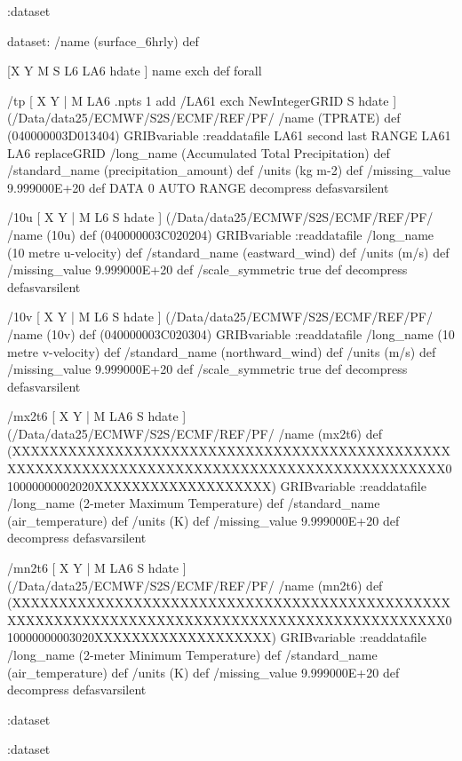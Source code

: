 \begin{ingrid}
:dataset

dataset:
/name (surface_6hrly) def

[X Y M S L6 LA6 hdate ] {name exch def } forall

 /tp { [ X Y | M LA6 .npts 1 add /LA61 exch NewIntegerGRID S hdate ] (/Data/data25/ECMWF/S2S/ECMF/REF/PF/%
 /name (TPRATE) def
  (040000003D013404) GRIBvariable
 :readdatafile
 LA61 second last RANGE
 LA61 LA6 replaceGRID 
 /long_name (Accumulated Total Precipitation) def
 /standard_name (precipitation_amount) def
 /units (kg m-2) def
 /missing_value 9.999000E+20 def
 DATA 0 AUTO RANGE
 decompress
 } defasvarsilent


 /10u { [ X Y | M L6 S hdate ] (/Data/data25/ECMWF/S2S/ECMF/REF/PF/%
/name (10u) def
(040000003C020204) GRIBvariable
:readdatafile
/long_name (10 metre u-velocity) def
/standard_name (eastward_wind) def
/units (m/s) def
/missing_value 9.999000E+20 def
/scale_symmetric true def
decompress
} defasvarsilent

/10v { [ X Y | M L6 S hdate ] (/Data/data25/ECMWF/S2S/ECMF/REF/PF/%
/name (10v) def
(040000003C020304) GRIBvariable
:readdatafile
/long_name (10 metre v-velocity) def
/standard_name (northward_wind) def
/units (m/s) def
/missing_value 9.999000E+20 def
/scale_symmetric true def
decompress
} defasvarsilent


 /mx2t6 { [ X Y | M LA6 S hdate ] (/Data/data25/ECMWF/S2S/ECMF/REF/PF/%
 /name (mx2t6) def
 (XXXXXXXXXXXXXXXXXXXXXXXXXXXXXXXXXXXXXXXXXXXXXXXXXXXXXXXXXXXXXXXXXXXXXXXXXXXXXXXXXXXXXXXXXXXXXX010000000002020XXXXXXXXXXXXXXXXXXX) GRIBvariable
:readdatafile
/long_name (2-meter Maximum Temperature) def
/standard_name (air_temperature) def
/units (K) def
/missing_value 9.999000E+20 def
decompress
 } defasvarsilent

 /mn2t6 { [ X Y | M LA6 S hdate ] (/Data/data25/ECMWF/S2S/ECMF/REF/PF/%
/name (mn2t6) def
(XXXXXXXXXXXXXXXXXXXXXXXXXXXXXXXXXXXXXXXXXXXXXXXXXXXXXXXXXXXXXXXXXXXXXXXXXXXXXXXXXXXXXXXXXXXXXX010000000003020XXXXXXXXXXXXXXXXXXX) GRIBvariable
:readdatafile
/long_name (2-meter Minimum Temperature) def
/standard_name (air_temperature) def
/units (K) def
/missing_value 9.999000E+20 def
decompress 
} defasvarsilent 

:dataset

:dataset

\end{ingrid}




